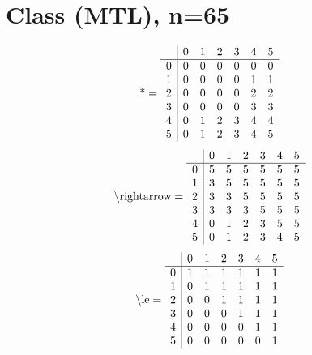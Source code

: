 \documentclass[11pt]{article}
\begin{document}
\section{Class (MTL), n=65}
\[\text{*} = 
\begin{array}{r | r r r r r r}
 & 0 & 1 & 2 & 3 & 4 & 5 \\ \hline
0 & 0 & 0 & 0 & 0 & 0 & 0 \\
1 & 0 & 0 & 0 & 0 & 1 & 1 \\
2 & 0 & 0 & 0 & 0 & 2 & 2 \\
3 & 0 & 0 & 0 & 0 & 3 & 3 \\
4 & 0 & 1 & 2 & 3 & 4 & 4 \\
5 & 0 & 1 & 2 & 3 & 4 & 5 \\
\end{array}
\]
\[\text{\textbackslash rightarrow} = 
\begin{array}{r | r r r r r r}
 & 0 & 1 & 2 & 3 & 4 & 5 \\ \hline
0 & 5 & 5 & 5 & 5 & 5 & 5 \\
1 & 3 & 5 & 5 & 5 & 5 & 5 \\
2 & 3 & 3 & 5 & 5 & 5 & 5 \\
3 & 3 & 3 & 3 & 5 & 5 & 5 \\
4 & 0 & 1 & 2 & 3 & 5 & 5 \\
5 & 0 & 1 & 2 & 3 & 4 & 5 \\
\end{array}
\]
\[\text{\textbackslash le} = 
\begin{array}{r | r r r r r r}
 & 0 & 1 & 2 & 3 & 4 & 5 \\ \hline
0 & 1 & 1 & 1 & 1 & 1 & 1 \\
1 & 0 & 1 & 1 & 1 & 1 & 1 \\
2 & 0 & 0 & 1 & 1 & 1 & 1 \\
3 & 0 & 0 & 0 & 1 & 1 & 1 \\
4 & 0 & 0 & 0 & 0 & 1 & 1 \\
5 & 0 & 0 & 0 & 0 & 0 & 1 \\
\end{array}
\]
\end{document}
